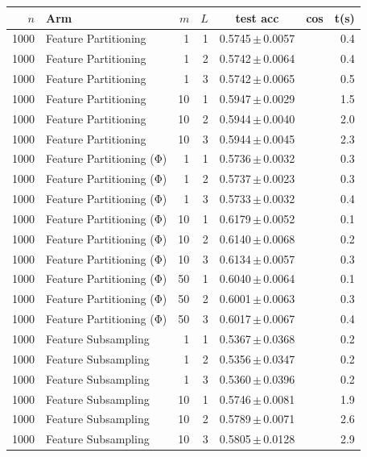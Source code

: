 \begin{table}[ht]
\centering\small
\begin{tabular}{rlrrccr}
\toprule
$n$ & Arm & $m$ & $L$ & test acc & cos & t(s) \\
\midrule
1000 & Feature Partitioning & 1 & 1 & 0.5745\,$\pm$\,0.0057 &  & 0.4 \\
1000 & Feature Partitioning & 1 & 2 & 0.5742\,$\pm$\,0.0064 &  & 0.4 \\
1000 & Feature Partitioning & 1 & 3 & 0.5742\,$\pm$\,0.0065 &  & 0.5 \\
1000 & Feature Partitioning & 10 & 1 & 0.5947\,$\pm$\,0.0029 &  & 1.5 \\
1000 & Feature Partitioning & 10 & 2 & 0.5944\,$\pm$\,0.0040 &  & 2.0 \\
1000 & Feature Partitioning & 10 & 3 & 0.5944\,$\pm$\,0.0045 &  & 2.3 \\
1000 & Feature Partitioning (Φ) & 1 & 1 & 0.5736\,$\pm$\,0.0032 &  & 0.3 \\
1000 & Feature Partitioning (Φ) & 1 & 2 & 0.5737\,$\pm$\,0.0023 &  & 0.3 \\
1000 & Feature Partitioning (Φ) & 1 & 3 & 0.5733\,$\pm$\,0.0032 &  & 0.4 \\
1000 & Feature Partitioning (Φ) & 10 & 1 & 0.6179\,$\pm$\,0.0052 &  & 0.1 \\
1000 & Feature Partitioning (Φ) & 10 & 2 & 0.6140\,$\pm$\,0.0068 &  & 0.2 \\
1000 & Feature Partitioning (Φ) & 10 & 3 & 0.6134\,$\pm$\,0.0057 &  & 0.3 \\
1000 & Feature Partitioning (Φ) & 50 & 1 & 0.6040\,$\pm$\,0.0064 &  & 0.1 \\
1000 & Feature Partitioning (Φ) & 50 & 2 & 0.6001\,$\pm$\,0.0063 &  & 0.3 \\
1000 & Feature Partitioning (Φ) & 50 & 3 & 0.6017\,$\pm$\,0.0067 &  & 0.4 \\
1000 & Feature Subsampling & 1 & 1 & 0.5367\,$\pm$\,0.0368 &  & 0.2 \\
1000 & Feature Subsampling & 1 & 2 & 0.5356\,$\pm$\,0.0347 &  & 0.2 \\
1000 & Feature Subsampling & 1 & 3 & 0.5360\,$\pm$\,0.0396 &  & 0.2 \\
1000 & Feature Subsampling & 10 & 1 & 0.5746\,$\pm$\,0.0081 &  & 1.9 \\
1000 & Feature Subsampling & 10 & 2 & 0.5789\,$\pm$\,0.0071 &  & 2.6 \\
1000 & Feature Subsampling & 10 & 3 & 0.5805\,$\pm$\,0.0128 &  & 2.9 \\

\end{tabular}
\end{table}
